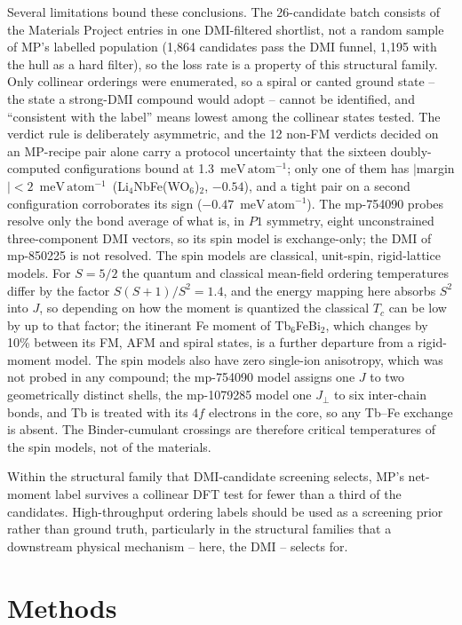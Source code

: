 \documentclass[aps,prb,preprint,superscriptaddress,longbibliography,nofootinbib]{revtex4-2}
\newcommand{\meVat}{\ensuremath{\mathrm{meV\,atom^{-1}}}}
\begin{document}
Several limitations bound these conclusions. The 26-candidate batch consists of the Materials Project
entries in one DMI-filtered shortlist, not a random sample of MP's labelled population (1{,}864 candidates pass
the DMI funnel, 1{,}195 with the hull as a hard filter), so the loss rate is a property of this structural
family. Only collinear orderings were enumerated, so a spiral or canted ground state -- the state a strong-DMI
compound would adopt -- cannot be identified, and ``consistent with the label'' means lowest among the collinear
states tested. The verdict rule is deliberately asymmetric, and the 12 non-FM verdicts decided on an MP-recipe
pair alone carry a protocol uncertainty that the sixteen doubly-computed configurations bound at 1.3~\meVat;
only one of them has $|$margin$|<2$~\meVat\ (Li$_4$NbFe(WO$_6$)$_2$, $-0.54$), and a tight pair on a second
configuration corroborates its sign ($-0.47$~\meVat). The mp-754090 probes resolve only the bond average of what
is, in $P1$ symmetry, eight unconstrained three-component DMI vectors, so its spin model is exchange-only; the DMI of mp-850225 is not resolved. The spin models are classical, unit-spin,
rigid-lattice models. For $S=5/2$ the quantum and classical mean-field ordering
temperatures differ by the factor $S(S+1)/S^2=1.4$, and the energy mapping here absorbs $S^2$ into $J$, so
depending on how the moment is quantized the classical $T_c$ can be low by up to that factor; the itinerant Fe
moment of Tb$_6$FeBi$_2$, which changes by 10\% between its FM, AFM and spiral states, is a further departure
from a rigid-moment model. The spin models also have zero single-ion anisotropy, which was not probed in any compound; the mp-754090
model assigns one $J$ to two geometrically distinct shells, the mp-1079285 model one $J_\perp$ to six
inter-chain bonds, and Tb is treated with its $4f$ electrons in the core, so any Tb--Fe exchange is absent.
The Binder-cumulant crossings are therefore critical temperatures of the spin models, not of the materials.

Within the structural family that DMI-candidate screening selects, MP's net-moment label survives a collinear
DFT test for fewer than a third of the candidates. High-throughput ordering labels should be used as a screening prior rather than ground truth,
particularly in the structural families that a downstream physical mechanism -- here, the DMI -- selects for.

\section*{Methods}
\end{document}
